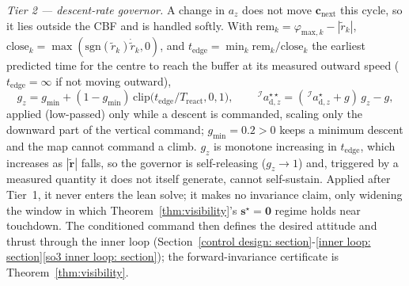 \documentclass{IEEEtaes}
\theoremstyle{definition}
\theoremstyle{remark}
\begin{document}
\emph{Tier 2 --- descent-rate governor.} A change in $a_z$ does not move $\boldsymbol{c}_\text{next}$ this cycle, so it lies outside the CBF and is handled softly. With $\text{rem}_k=\varphi_{\text{max},k}-|\tilde r_k|$, $\text{close}_k=\max(\mathrm{sgn}(\tilde r_k)\dot{\tilde r}_k,0)$, and $t_\text{edge}=\min_k \text{rem}_k/\text{close}_k$ the earliest predicted time for the centre to reach the buffer at its measured outward speed ($t_\text{edge}=\infty$ if not moving outward),
\begin{equation} \label{cbf gz: equation}
    g_z=g_\text{min}+(1-g_\text{min})\,\mathrm{clip}\!\big(t_\text{edge}/T_\text{react},0,1\big),\qquad
    \,^\mathcal{I}a_{\text{d},z}^{\star\star}=(\,^\mathcal{I}a_{\text{d},z}^\star+g)\,g_z-g,
\end{equation}
applied (low-passed) only while a descent is commanded, scaling only the downward part of the vertical command; $g_\text{min}=0.2>0$ keeps a minimum descent and the map cannot command a climb. $g_z$ is monotone increasing in $t_\text{edge}$, which increases as $|\tilde{\boldsymbol{r}}|$ falls, so the governor is self-releasing ($g_z\to1$) and, triggered by a measured quantity it does not itself generate, cannot self-sustain. Applied after Tier~1, it never enters the lean solve; it makes no invariance claim, only widening the window in which Theorem~\ref{thm:visibility}'s $\boldsymbol{s}^\star=\boldsymbol{0}$ regime holds near touchdown. The conditioned command then defines the desired attitude and thrust through the inner loop (Section~\ref{control design: section}-\ref{inner loop: section}\ref{so3 inner loop: section}); the forward-invariance certificate is Theorem~\ref{thm:visibility}.
\end{document}
